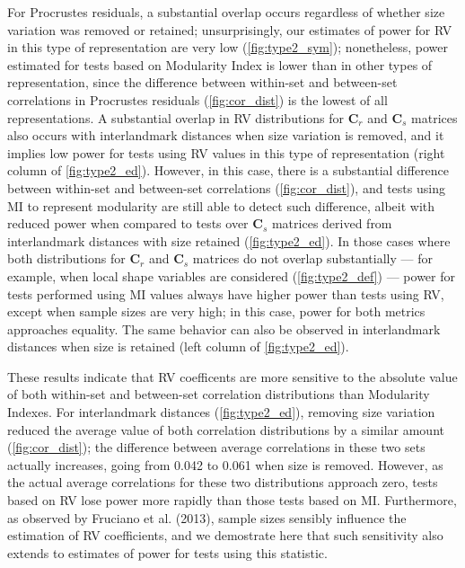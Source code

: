 \documentclass[12pt,]{article}
\begin{document}
For Procrustes residuals, a substantial overlap occurs regardless of
whether size variation was removed or retained; unsurprisingly, our
estimates of power for RV in this type of representation are very low
(\autoref{fig:type2_sym}); nonetheless, power estimated for tests based
on Modularity Index is lower than in other types of representation,
since the difference between within-set and between-set correlations in
Procrustes residuals (\autoref{fig:cor_dist}) is the lowest of all
representations. A substantial overlap in RV distributions for
$\mathbf{C}_r$ and $\mathbf{C}_s$ matrices also occurs with
interlandmark distances when size variation is removed, and it implies
low power for tests using RV values in this type of representation
(right column of \autoref{fig:type2_ed}). However, in this case, there
is a substantial difference between within-set and between-set
correlations (\autoref{fig:cor_dist}), and tests using MI to represent
modularity are still able to detect such difference, albeit with reduced
power when compared to tests over $\mathbf{C}_s$ matrices derived from
interlandmark distances with size retained (\autoref{fig:type2_ed}). In
those cases where both distributions for $\mathbf{C}_r$ and
$\mathbf{C}_s$ matrices do not overlap substantially --- for example,
when local shape variables are considered (\autoref{fig:type2_def}) ---
power for tests performed using MI values always have higher power than
tests using RV, except when sample sizes are very high; in this case,
power for both metrics approaches equality. The same behavior can also
be observed in interlandmark distances when size is retained (left
column of \autoref{fig:type2_ed}).

These results indicate that RV coefficents are more sensitive to the
absolute value of both within-set and between-set correlation
distributions than Modularity Indexes. For interlandmark distances
(\autoref{fig:type2_ed}), removing size variation reduced the average
value of both correlation distributions by a similar amount
(\autoref{fig:cor_dist}); the difference between average correlations in
these two sets actually increases, going from 0.042 to 0.061 when size
is removed. However, as the actual average correlations for these two
distributions approach zero, tests based on RV lose power more rapidly
than those tests based on MI. Furthermore, as observed by Fruciano et
al. (2013), sample sizes sensibly influence the estimation of RV
coefficients, and we demostrate here that such sensitivity also extends
to estimates of power for tests using this statistic.
\end{document}
